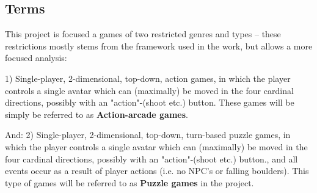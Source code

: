 \documentclass[a4paper,titlepage,final]{report}
\begin{document}
\begin{center}
\end{center}

\subsection{Terms}
This project is focused a games of two restricted genres and types -- these restrictions mostly stems from the framework used in the work, but allows a more focused analysis: 

1) Single-player, 2-dimensional, top-down, action games, in which the player controls a single avatar which can (maximally) be moved in the four cardinal directions, possibly with an "action"-(shoot etc.) button.
These games will be simply be referred to as \textbf{Action-arcade games}.

And: 2) Single-player, 2-dimensional, top-down, turn-based puzzle games, in which the player controls a single avatar which can (maximally) be moved in the four cardinal directions, possibly with an "action"-(shoot etc.) button., and all events occur as a result of player actions (i.e. no NPC's or falling boulders). 
This type of games will be referred to as \textbf{Puzzle games} in the project.

\end{document}
